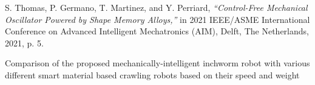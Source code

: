 S. Thomas, P. Germano, T. Martinez, and Y. Perriard, \textit{“Control-Free Mechanical Oscillator Powered by Shape Memory Alloys,”} in 2021 IEEE/ASME International Conference on Advanced Intelligent Mechatronics (AIM), Delft, The Netherlands, 2021, p. 5.\\

\begin{table}[htp!]
 \centering
 \hfill
 \caption{Comparison of the proposed mechanically-intelligent inchworm robot with various different smart material based crawling robots based on their speed and weight}
 \label{tab:literature-compare}
 
\end{table}
